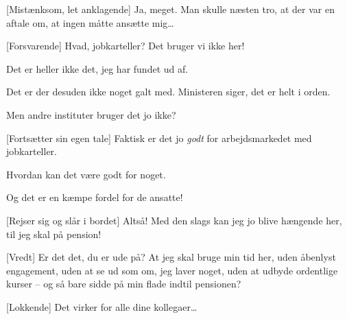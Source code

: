 \documentclass[a4paper,11pt]{article}
\begin{document}
\begin{sketch}
[Mistænksom, let anklagende] Ja, meget. Man skulle næsten tro, at der
var en aftale om, at ingen måtte ansætte mig\ldots

[Forsvarende] Hvad, jobkarteller? Det bruger vi ikke her!

 Det er heller ikke det, jeg har fundet ud af.

 Det er der desuden ikke noget galt med. Ministeren siger, det er
helt i orden.

 Men andre instituter bruger det jo ikke?

[Fortsætter sin egen tale] Faktisk er det jo \emph{godt} for
arbejdsmarkedet med jobkarteller. 

 Hvordan kan det være godt for noget.

 Og det er en kæmpe fordel for de ansatte!

[Rejser sig og slår i bordet] Altså! Med den slags kan jeg jo blive
hængende her, til jeg skal på pension!


[Vredt] Er det det, du er ude på? At jeg skal bruge min tid her, uden
åbenlyst engagement, uden at se ud som om, jeg laver noget, uden at udbyde
ordentlige kurser -- og så bare sidde på min flade indtil pensionen?

[Lokkende] Det virker for alle dine kollegaer\ldots

%
%
%

\end{sketch}
\end{document}
